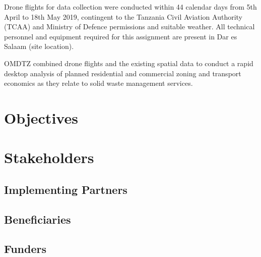 \documentclass[a4paper,12pt,twoside]{article}
\begin{document}
Drone flights for data collection were conducted within 44 calendar days from 5th April to 18th May 2019, contingent  to the Tanzania Civil Aviation Authority (TCAA) and Ministry of Defence permissions and suitable weather. All technical personnel and equipment required for this assignment are present in Dar es Salaam (site location). 

OMDTZ  combined drone flights and the existing spatial data to conduct a rapid desktop analysis of planned residential and commercial zoning and transport economics as they relate to solid waste management services.

\section{Objectives}

\begin{multicols}{2}
\lipsum[0-5]
\end{multicols}

\section{Stakeholders}

\begin{multicols}{2}
\lipsum[0-5]
\end{multicols}

\subsection{Implementing Partners}

\begin{multicols}{2}
\lipsum[0-5]
\end{multicols}

\subsection{Beneficiaries}

\begin{multicols}{2}
\lipsum[0-5]
\end{multicols}

\subsection{Funders}

\begin{multicols}{2}
\lipsum[0-5]
\end{multicols}
\end{document}
